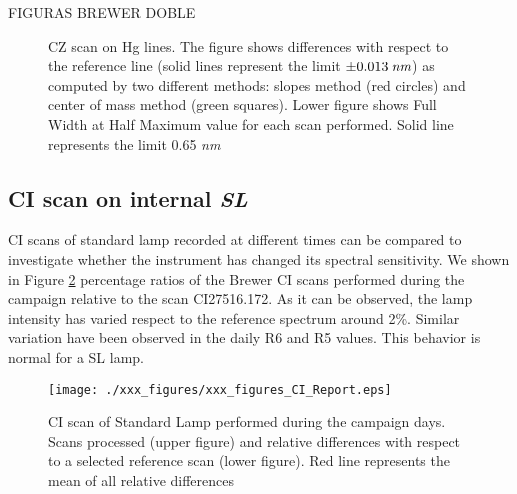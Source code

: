 FIGURAS BREWER DOBLE

\begin{figure}[bhtp!]
\begin{center}

\caption{CZ scan on Hg lines. The figure shows differences with respect to the reference line (solid lines represent the limit $\pm0.013\:\emph{nm}$) as computed by two different methods: slopes method (red circles) and center of mass method (green squares). Lower figure shows Full Width at Half Maximum value for each scan performed. Solid line represents the limit 0.65 \emph{nm}}
\label{fig:CZreport1}

\end{center}
\end{figure}

\newpage
\subsection{CI scan on internal \emph{SL}} \label{subsec:CI}
CI scans of standard lamp recorded at different times can be compared to investigate whether the instrument has changed its spectral sensitivity. We shown in Figure \ref{fig:CIreport} percentage ratios of the Brewer \textbf{\brwname} CI scans performed during the campaign relative to the scan CI27516.172. As it can be observed, the lamp intensity has varied respect to the reference spectrum around 2\%. Similar variation have been observed in the daily  R6 and R5 values. This behavior is normal for a SL lamp.
\begin{figure}[hbtp!]
\begin{center}   
\texttt{[image: ./xxx\_figures/xxx\_figures\_CI\_Report.eps]}
           \caption{CI scan of Standard Lamp performed during the campaign days. Scans processed (upper figure) and relative differences with respect to a selected reference scan (lower figure). Red line represents the mean of all relative differences}
	         \label{fig:CIreport}
\end{center}
\end{figure}
